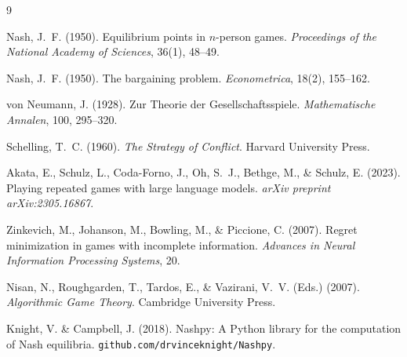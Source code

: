 \documentclass[10pt,twocolumn]{article}
\begin{document}
\begin{thebibliography}{9}

Nash, J.~F. (1950).
Equilibrium points in $n$-person games.
\textit{Proceedings of the National Academy of Sciences}, 36(1), 48--49.

Nash, J.~F. (1950).
The bargaining problem.
\textit{Econometrica}, 18(2), 155--162.

von Neumann, J. (1928).
Zur Theorie der Gesellschaftsspiele.
\textit{Mathematische Annalen}, 100, 295--320.

Schelling, T.~C. (1960).
\textit{The Strategy of Conflict}.
Harvard University Press.

Akata, E., Schulz, L., Coda-Forno, J., Oh, S.~J., Bethge, M., \& Schulz, E. (2023).
Playing repeated games with large language models.
\textit{arXiv preprint arXiv:2305.16867}.

Zinkevich, M., Johanson, M., Bowling, M., \& Piccione, C. (2007).
Regret minimization in games with incomplete information.
\textit{Advances in Neural Information Processing Systems}, 20.

Nisan, N., Roughgarden, T., Tardos, E., \& Vazirani, V.~V. (Eds.) (2007).
\textit{Algorithmic Game Theory}.
Cambridge University Press.

Knight, V. \& Campbell, J. (2018).
Nashpy: A Python library for the computation of Nash equilibria.
\texttt{github.com/drvinceknight/Nashpy}.

\end{thebibliography}
\end{document}
